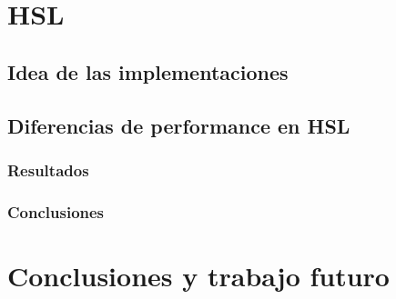\documentclass[a4paper]{article}
\begin{document}
\newpage

\section{HSL}

\subsection{Idea de las implementaciones}

\subsection{Diferencias de performance en HSL}



\subsubsection{Resultados}

\subsubsection{Conclusiones}


\newpage
\section{Conclusiones y trabajo futuro}
\end{document}
